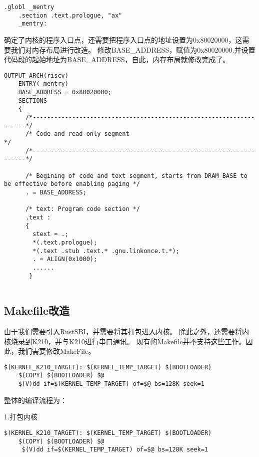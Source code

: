 \begin{lstlisting}[caption={修改内核程序入口点}, label={lst:change_kernel_entry}]
    .globl _mentry
    .section .text.prologue, "ax"
    _mentry:
\end{lstlisting}

确定了内核的程序入口点，还需要把程序入口点的地址设置为0x80020000，这需要我们对内存布局进行改造。
修改BASE\_ADDRESS，赋值为0x80020000.并设置代码段的起始地址为BASE\_ADDRESS，自此，内存布局就修改完成了。

\begin{lstlisting}[caption={修改内存布局}, label={lst:change_memory_layout}]
    OUTPUT_ARCH(riscv)
    ENTRY(_mentry)
    BASE_ADDRESS = 0x80020000;
    SECTIONS
    {
      /*--------------------------------------------------------------------*/
      /* Code and read-only segment                                         */
      /*--------------------------------------------------------------------*/
    
      /* Begining of code and text segment, starts from DRAM_BASE to be effective before enabling paging */
      . = BASE_ADDRESS;
      
      /* text: Program code section */
      .text : 
      {
        stext = .;
        *(.text.prologue);
        *(.text .stub .text.* .gnu.linkonce.t.*);
        . = ALIGN(0x1000);
        ......
       }
    
\end{lstlisting}

\subsection{Makefile改造}

由于我们需要引入RustSBI，并需要将其打包进入内核。
除此之外，还需要将内核烧录到K210，并与K210进行串口通讯。
现有的Makefile并不支持这些工作。因此，我们需要修改MakeFile\cite{Ma2006Analyse}。

\begin{lstlisting}[caption={修改Makefile}, label={lst:change_makefile}]
    $(KERNEL_K210_TARGET): $(KERNEL_TEMP_TARGET) $(BOOTLOADER)
    $(COPY) $(BOOTLOADER) $@
    $(V)dd if=$(KERNEL_TEMP_TARGET) of=$@ bs=128K seek=1
\end{lstlisting}

整体的编译流程为：

1.打包内核

\begin{lstlisting}[caption={打包内核}, label={lst:pack_kernel}]
    $(KERNEL_K210_TARGET): $(KERNEL_TEMP_TARGET) $(BOOTLOADER)
    $(COPY) $(BOOTLOADER) $@
     $(V)dd if=$(KERNEL_TEMP_TARGET) of=$@ bs=128K seek=1
\end{lstlisting}


